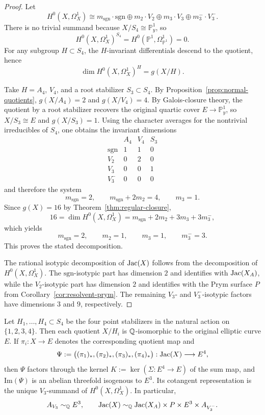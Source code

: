 \begin{proof}
Let
\[
H^0(X,\Omega_X^1)\cong m_{\mathrm{sgn}}\cdot\mathrm{sgn}\oplus m_2\cdot V_2\oplus m_3\cdot V_3\oplus m_3^-\cdot V_3^-.
\]
There is no trivial summand because \(X/S_4\cong\mathbb{P}^1_y\), so
\[
H^0(X,\Omega_X^1)^{S_4}=H^0(\mathbb{P}^1,\Omega_{\mathbb{P}^1}^1)=0.
\]
For any subgroup \(H\subset S_4\), the \(H\)-invariant differentials descend to the quotient, hence
\[
\dim H^0(X,\Omega_X^1)^H=g(X/H).
\]

Take \(H=A_4\), \(V_4\), and a root stabilizer \(S_3\subset S_4\).
By Proposition~\ref{prop:normal-quotients}, \(g(X/A_4)=2\) and \(g(X/V_4)=4\).
By Galois-closure theory, the quotient by a root stabilizer recovers the original quartic cover \(E\to\mathbb{P}^1_y\), so \(X/S_3\cong E\) and \(g(X/S_3)=1\).
Using the character averages for the nontrivial irreducibles of \(S_4\), one obtains the invariant dimensions
\[
\begin{array}{c|ccc}
 & A_4 & V_4 & S_3\\ \hline
\mathrm{sgn} & 1 & 1 & 0\\
V_2 & 0 & 2 & 0\\
V_3 & 0 & 0 & 1\\
V_3^- & 0 & 0 & 0
\end{array}
\]
and therefore the system
\[
m_{\mathrm{sgn}}=2,\qquad
m_{\mathrm{sgn}}+2m_2=4,\qquad
m_3=1.
\]
Since \(g(X)=16\) by Theorem~\ref{thm:regular-closure},
\[
16=\dim H^0(X,\Omega_X^1)=m_{\mathrm{sgn}}+2m_2+3m_3+3m_3^-,
\]
which yields
\[
m_{\mathrm{sgn}}=2,\qquad m_2=1,\qquad m_3=1,\qquad m_3^-=3.
\]
This proves the stated decomposition.

The rational isotypic decomposition of \(\operatorname{Jac}(X)\) follows from the decomposition of \(H^0(X,\Omega_X^1)\).
The \(\mathrm{sgn}\)-isotypic part has dimension \(2\) and identifies with \(\operatorname{Jac}(X_A)\), while the \(V_2\)-isotypic part has dimension \(2\) and identifies with the Prym surface \(P\) from Corollary~\ref{cor:resolvent-prym}.
The remaining \(V_3\)- and \(V_3^-\)-isotypic factors have dimensions \(3\) and \(9\), respectively.
\end{proof}

\begin{corollary}\label{cor:v3-elliptic-factor}
Let \(H_1,\dots,H_4\subset S_4\) be the four point stabilizers in the natural action on \(\{1,2,3,4\}\).
Then each quotient \(X/H_i\) is \(\mathbb{Q}\)-isomorphic to the original elliptic curve \(E\).
If \(\pi_i:X\to E\) denotes the corresponding quotient map and
\[
\Psi:=\bigl((\pi_1)_*,(\pi_2)_*,(\pi_3)_*,(\pi_4)_*\bigr):\operatorname{Jac}(X)\longrightarrow E^4,
\]
then \(\Psi\) factors through the kernel \(K:=\ker(\Sigma:E^4\to E)\) of the sum map, and \(\mathrm{Im}(\Psi)\) is an abelian threefold isogenous to \(E^3\).
Its cotangent representation is the unique \(V_3\)-summand of \(H^0(X,\Omega_X^1)\).
In particular,
\[
A_{V_3}\sim_{\mathbb{Q}} E^3,
\qquad
\operatorname{Jac}(X)\sim_{\mathbb{Q}}\operatorname{Jac}(X_A)\times P\times E^3\times A_{V_3^-}.
\]
\end{corollary}

